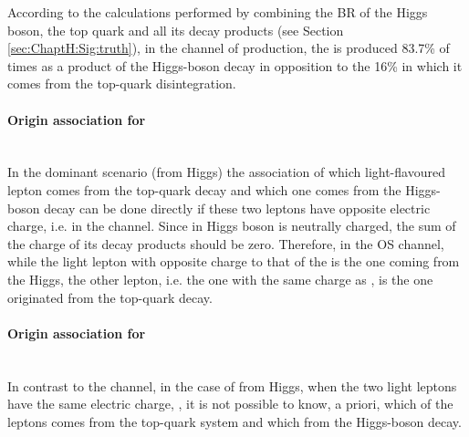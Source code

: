 According to the calculations performed by combining the BR of the Higgs boson, the top quark 
and all its decay products (see Section \ref{sec:ChaptH:Sig:truth}),
in the \dileptau channel of \tHq production, the \tauhad is produced 83.7\% of times as a 
product of the Higgs-boson decay in opposition to the 16\% in which it comes from the top-quark
disintegration. 

\paragraph{Origin association for \dilepOStau}\mbox{}\\ %
In the dominant scenario (\tauhad from Higgs) the association of which light-flavoured
lepton comes from the top-quark decay and which one comes from the Higgs-boson decay can be
done directly if these two leptons have opposite electric charge, i.e. in the \dilepOStau channel.
Since in Higgs boson is neutrally charged, the sum of the charge of its decay products should be zero. Therefore,
in the OS channel, while the light lepton with opposite charge to that of the \tauhad is the one coming
from the Higgs, the other lepton, i.e. the one with the same charge as \tauhad, is the one originated 
from the top-quark decay.



\paragraph{Origin association for \dilepSStau}\mbox{}\\ %
In contrast to the \dilepOStau channel, in the case of \tauhad from Higgs,
 when the two light leptons have the same electric charge, \dilepSStau,
it is not possible to know, a priori, which of the leptons comes from the top-quark system and which 
from the Higgs-boson decay. 

